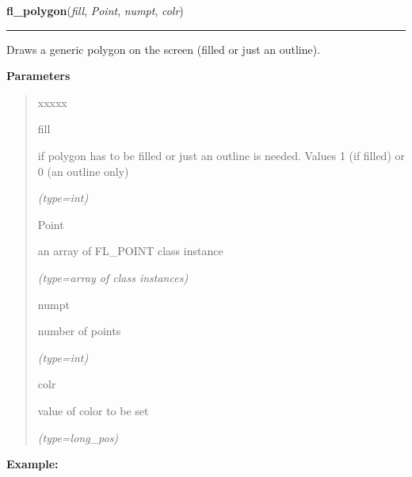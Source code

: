     \label{xformslib:flxbasic:fl_polygon}

    \vspace{0.5ex}

\hspace{.8\funcindent}\begin{boxedminipage}{\funcwidth}

    \raggedright \textbf{fl\_polygon}(\textit{fill}, \textit{Point}, \textit{numpt}, \textit{colr})

    \vspace{-1.5ex}

    \rule{\textwidth}{0.5\fboxrule}
\setlength{\parskip}{2ex}
    Draws a generic polygon on the screen (filled or just an outline).

\setlength{\parskip}{1ex}
      \textbf{Parameters}
      \vspace{-1ex}

      \begin{quote}
        \begin{Ventry}{xxxxx}

          \item[fill]

          if polygon has to be filled or just an outline is needed. Values 
          1 (if filled) or 0 (an outline only)

            {\it (type=int)}

          \item[Point]

          an array of FL\_POINT class instance

            {\it (type=array of class instances)}

          \item[numpt]

          number of points

            {\it (type=int)}

          \item[colr]

          value of color to be set

            {\it (type=long\_pos)}

        \end{Ventry}

      \end{quote}

\textbf{Example:}
\begin{quote}
  \begin{itemize}


\end{itemize}
\end{quote}
\end{boxedminipage}
